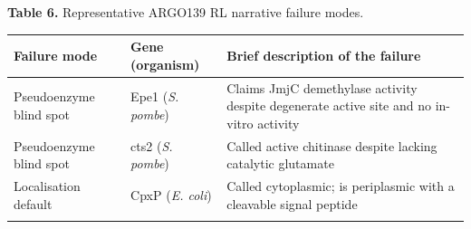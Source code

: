 \documentclass[
  11pt,
]{article}
\begin{document}
\textbf{Table 6.} Representative ARGO139 RL narrative failure modes.

\begin{longtable}[]{@{}lll@{}}
\toprule
\begin{minipage}[b]{0.30\columnwidth}\raggedright
Failure mode\strut
\end{minipage} & \begin{minipage}[b]{0.30\columnwidth}\raggedright
Gene (organism)\strut
\end{minipage} & \begin{minipage}[b]{0.30\columnwidth}\raggedright
Brief description of the failure\strut
\end{minipage}\tabularnewline
\midrule
\endhead
\begin{minipage}[t]{0.30\columnwidth}\raggedright
Pseudoenzyme blind spot\strut
\end{minipage} & \begin{minipage}[t]{0.30\columnwidth}\raggedright
Epe1 (\emph{S. pombe})\strut
\end{minipage} & \begin{minipage}[t]{0.30\columnwidth}\raggedright
Claims JmjC demethylase activity despite degenerate active site and no
in-vitro activity\strut
\end{minipage}\tabularnewline
\begin{minipage}[t]{0.30\columnwidth}\raggedright
Pseudoenzyme blind spot\strut
\end{minipage} & \begin{minipage}[t]{0.30\columnwidth}\raggedright
cts2 (\emph{S. pombe})\strut
\end{minipage} & \begin{minipage}[t]{0.30\columnwidth}\raggedright
Called active chitinase despite lacking catalytic glutamate\strut
\end{minipage}\tabularnewline
\begin{minipage}[t]{0.30\columnwidth}\raggedright
Localisation default\strut
\end{minipage} & \begin{minipage}[t]{0.30\columnwidth}\raggedright
CpxP (\emph{E. coli})\strut
\end{minipage} & \begin{minipage}[t]{0.30\columnwidth}\raggedright
Called cytoplasmic; is periplasmic with a cleavable signal peptide\strut
\end{minipage}\tabularnewline
\begin{minipage}[t]{0.30\columnwidth}\raggedright

\end{minipage}
\end{longtable}
\end{document}
